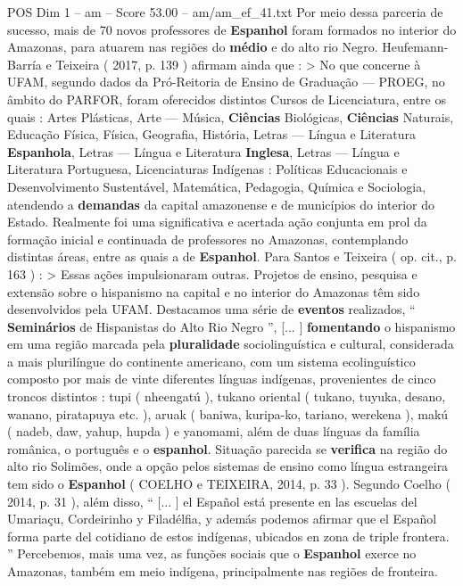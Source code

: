 \begin{textsample}{POS Dim 1 – am – Score 53.00 – am/am\_ef\_41.txt}
Por meio dessa parceria de sucesso, mais de 70 novos professores de \textbf{Espanhol} foram formados no interior do Amazonas, para atuarem nas regiões do \textbf{médio} e do alto rio Negro.
Heufemann-Barría e Teixeira ( 2017, p. 139 ) afirmam ainda que : > No que concerne à UFAM, segundo dados da Pró-Reitoria de Ensino de Graduação — PROEG, no âmbito do PARFOR, foram oferecidos distintos Cursos de Licenciatura, entre os quais : Artes Plásticas, Arte — Música, \textbf{Ciências} Biológicas, \textbf{Ciências} Naturais, Educação Física, Física, Geografia, História, Letras — Língua e Literatura \textbf{Espanhola}, Letras — Língua e Literatura \textbf{Inglesa}, Letras — Língua e Literatura Portuguesa, Licenciaturas Indígenas : Políticas Educacionais e Desenvolvimento Sustentável, Matemática, Pedagogia, Química e Sociologia, atendendo a \textbf{demandas} da capital amazonense e de municípios do interior do Estado.
Realmente foi uma significativa e acertada ação conjunta em prol da formação inicial e continuada de professores no Amazonas, contemplando distintas áreas, entre as quais a de \textbf{Espanhol}.
Para Santos e Teixeira ( op. cit., p. 163 ) : > Essas ações impulsionaram outras.
Projetos de ensino, pesquisa e extensão sobre o hispanismo na capital e no interior do Amazonas têm sido desenvolvidos pela UFAM.
Destacamos uma série de \textbf{eventos} realizados, “ \textbf{Seminários} de Hispanistas do Alto Rio Negro ”, [... ] \textbf{fomentando} o hispanismo em uma região marcada pela \textbf{pluralidade} sociolinguística e cultural, considerada a mais plurilíngue do continente americano, com um sistema ecolinguístico composto por mais de vinte diferentes línguas indígenas, provenientes de cinco troncos distintos : tupi ( nheengatú ), tukano oriental ( tukano, tuyuka, desano, wanano, piratapuya etc. ), aruak ( baniwa, kuripa-ko, tariano, werekena ), makú ( nadeb, daw, yahup, hupda ) e yanomami, além de duas línguas da família românica, o português e o \textbf{espanhol}.
Situação parecida se \textbf{verifica} na região do alto rio Solimões, onde a opção pelos sistemas de ensino como língua estrangeira tem sido o \textbf{Espanhol} ( COELHO e TEIXEIRA, 2014, p. 33 ).
Segundo Coelho ( 2014, p. 31 ), além disso, “ [... ] el Español está presente en las escuelas del Umariaçu, Cordeirinho y Filadélfia, y además podemos afirmar que el Español forma parte del cotidiano de estos indígenas, ubicados en zona de triple frontera. ” Percebemos, mais uma vez, as funções sociais que o \textbf{Espanhol} exerce no Amazonas, também em meio indígena, principalmente nas regiões de fronteira.

\end{textsample}
